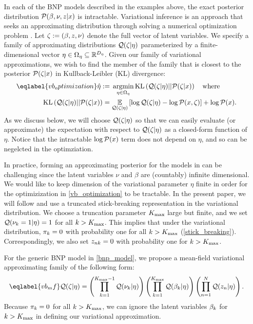 In each of the BNP models described in the examples above,
the exact posterior distribution $\mathcal{P}(\beta, \nu, z \vert x)$
is intractable.
Variational inference is an approach that seeks an approximating distribution
through solving a numerical optimization problem
\citep{jordan:1999:vi, wainwright:2008:graphical_models, blei:2017:vi_review}.
Let $\zeta := (\beta, z, \nu)$ denote the full vector of
latent variables.
We specify a
family of approximating distributions $\mathcal{Q}(\zeta \vert \eta)$
parameterized by a finite-dimensional vector $\eta \in \Omega_{\eta} \subseteq
\mathbb{R}^{{D_{\eta}}}$.
Given our family of variational approximations, we wish to find the member of
the family that is closest to the posterior $\mathcal{P}(\zeta \vert x)$ in
Kullback-Leibler (KL) divergence:
%
\begin{align}\eqlabel{vb_optimization}
%
\etaopt :={}&
    \argmin_{\eta \in \etadom}
        \KL{\q(\zeta \vert \eta) || \p(\zeta \vert \x)} \mathwhere \\
\KL{\q(\zeta \vert \eta) || \p(\zeta \vert \x)}
={}&    \expect{\q(\zeta \vert \eta)}{
        \log \q(\zeta \vert \eta) - \logp(\x, \zeta)} + \logp(\x). \nonumber
%
\end{align}
%
As we discuss
below, we will choose $\mathcal{Q}(\zeta \vert \eta)$ so that we can easily evaluate (or approximate)
the expectation with respect to $\mathcal{Q}(\zeta \vert \eta)$
as a closed-form function of $\eta$.
Notice that the intractable $\log \mathcal{P}(x)$ term does not depend on $\eta$, and
so can be negelcted in the optimziation.

In practice, forming an approximating posterior for the models in
can be challenging since the latent variables $\nu$ and $\beta$ are
(countably) infinite dimensional.
We would like to keep dimension of the variational parameter $\eta$ finite
in order for the optimizization in \eqref{vb_optimization} to be tractable.
In the present paper, we will follow \citet{blei:2006:vi_for_dp} and
use a truncated stick-breaking representation in
the variational distribution.
We choose a truncation parameter ${K_{\mathrm{max}}}$ large but finite,
and we set $\mathcal{Q}(\nu_k = 1 | \eta) = 1$ for all $k > {K_{\mathrm{max}}}$.
This implies that under the variational distribution, $\pi_k = 0$ with probability one
for all $k > {K_{\mathrm{max}}}$
(\eqref{stick_breaking}).
Correspondingly, we also set $z_{nk} = 0$ with probability one for $k > {K_{\mathrm{max}}}$.

For the generic BNP model in \eqref{bnp_model},
we propose a mean-field variational approximating family of the following form:
%
\begin{align}\eqlabel{vb_mf}
%
\q(\zeta \vert \eta) =
    \left( \prod_{\k=1}^{\kmax - 1} \q(\nuk \vert \eta) \right)
    \left( \prod_{\k=1}^{\kmax} \q(\beta_\k \vert \eta) \right)
    \left( \prod_{\n=1}^{\N} \q(\z_{\n} \vert \eta) \right).
%
\end{align}
Because $\pi_k = 0$ for all $k > {K_{\mathrm{max}}}$,
we can ignore the latent variables $\beta_k$ for $k > {K_{\mathrm{max}}}$ in
defining our variational approximation.

